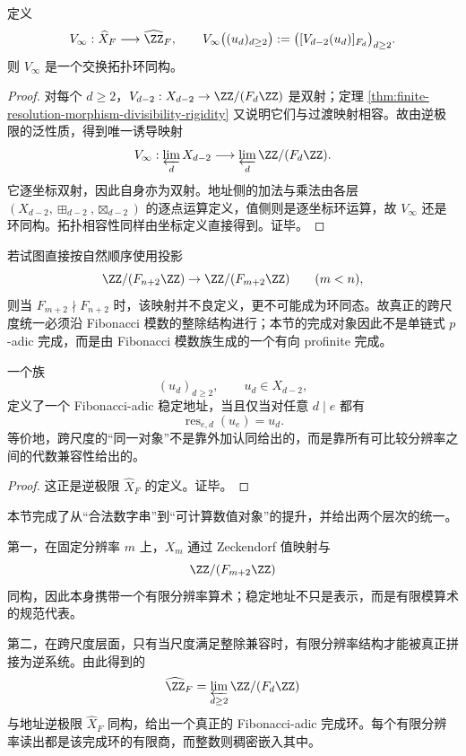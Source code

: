 \begin{theorem}
定义
\[
V_\infty:\widehat X_F\longrightarrow \widehat{\ZZ}_F,
\qquad
V_\infty\bigl((u_d)_{d\ge 2}\bigr)
:=
\bigl([V_{d-2}(u_d)]_{F_d}\bigr)_{d\ge 2}.
\]
则 \(V_\infty\) 是一个交换拓扑环同构。
\end{theorem}
\begin{proof}
对每个 \(d\ge 2\)，\(V_{d-2}:X_{d-2}\to \ZZ/(F_d\ZZ)\) 是双射；定理 \ref{thm:finite-resolution-morphism-divisibility-rigidity} 又说明它们与过渡映射相容。故由逆极限的泛性质，得到唯一诱导映射
\[
V_\infty:\varprojlim_{d} X_{d-2}\longrightarrow \varprojlim_d \ZZ/(F_d\ZZ).
\]
它逐坐标双射，因此自身亦为双射。地址侧的加法与乘法由各层 \((X_{d-2},\boxplus_{d-2},\boxtimes_{d-2})\) 的逐点运算定义，值侧则是逐坐标环运算，故 \(V_\infty\) 还是环同构。拓扑相容性同样由坐标定义直接得到。证毕。
\end{proof}

\begin{remark}[为何不能直接按 \(m=1,2,3,\dots\) 取逆极限]
若试图直接按自然顺序使用投影
\[
\ZZ/(F_{n+2}\ZZ)\to \ZZ/(F_{m+2}\ZZ)
\qquad (m<n),
\]
则当 \(F_{m+2}\nmid F_{n+2}\) 时，该映射并不良定义，更不可能成为环同态。故真正的跨尺度统一必须沿 Fibonacci 模数的整除结构进行；本节的完成对象因此不是单链式 \(p\)-adic 完成，而是由 Fibonacci 模数族生成的一个有向 profinite 完成。
\end{remark}

\begin{proposition}[稳定地址族的完成性解释]
一个族
\[
(u_d)_{d\ge 2},\qquad u_d\in X_{d-2},
\]
定义了一个 Fibonacci-adic 稳定地址，当且仅当对任意 \(d\mid e\) 都有
\[
\operatorname{res}_{e,d}(u_e)=u_d.
\]
等价地，跨尺度的“同一对象”不是靠外加认同给出的，而是靠所有可比较分辨率之间的代数兼容性给出的。
\end{proposition}
\begin{proof}
这正是逆极限 \(\widehat X_F\) 的定义。证毕。
\end{proof}

\begin{remark}
本节完成了从“合法数字串”到“可计算数值对象”的提升，并给出两个层次的统一。

第一，在固定分辨率 \(m\) 上，\(X_m\) 通过 Zeckendorf 值映射与
\[
\ZZ/(F_{m+2}\ZZ)
\]
同构，因此本身携带一个有限分辨率算术；稳定地址不只是表示，而是有限模算术的规范代表。

第二，在跨尺度层面，只有当尺度满足整除兼容时，有限分辨率结构才能被真正拼接为逆系统。由此得到的
\[
\widehat{\ZZ}_F
=
\varprojlim_{d\ge 2}\ZZ/(F_d\ZZ)
\]
与地址逆极限 \(\widehat X_F\) 同构，给出一个真正的 Fibonacci-adic 完成环。每个有限分辨率读出都是该完成环的有限商，而整数则稠密嵌入其中。
\end{remark}

